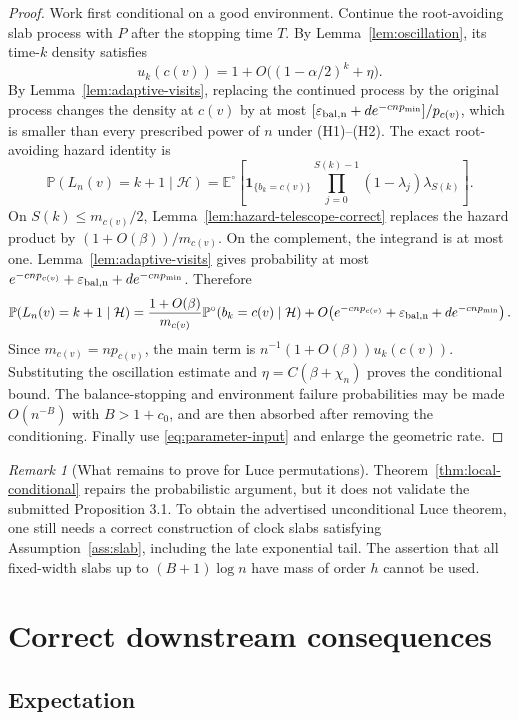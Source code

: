 \documentclass[11pt]{article}
\newcommand{\E}{\mathbb E}
\newcommand{\Pp}{\mathbb P}
\newcommand{\1}{\mathbf 1}
\newcommand{\cH}{\mathcal H}
\theoremstyle{remark}
\newtheorem{remark}[theorem]{Remark}
\begin{document}
\begin{proof}
Work first conditional on a good environment.  Continue the root-avoiding
slab process with $P$ after the stopping time $T$.  By
Lemma~\ref{lem:oscillation}, its time-$k$ density satisfies
\[
 u_k(c(v))=1+O\bigl((1-\alpha/2)^k+\eta\bigr).
\]
By Lemma~\ref{lem:adaptive-visits}, replacing the continued process by the
original process changes the density at $c(v)$ by at most
$[\varepsilon_{\rm bal,n}+d e^{-cnp_{\min}}]/p_{c(v)}$, which is smaller than
every prescribed power of $n$ under (H1)--(H2).  The exact root-avoiding hazard identity is
\[
 \Pp(L_n(v)=k+1\mid\cH)
 =\E^\circ\left[
  \1_{\{b_k=c(v)\}}
  \prod_{j=0}^{S(k)-1}(1-\lambda_j)\lambda_{S(k)}
 \right].
\]
On $S(k)\le m_{c(v)}/2$, Lemma~\ref{lem:hazard-telescope-correct} replaces
the hazard product by $(1+O(\beta))/m_{c(v)}$.  On the complement, the integrand is at most one.  Lemma~\ref{lem:adaptive-visits}
gives probability at most
$e^{-cnp_{c(v)}}+\varepsilon_{\rm bal,n}+d e^{-cnp_{\min}}$.  Therefore
\[
 \Pp(L_n(v)=k+1\mid\cH)
 =\frac{1+O(\beta)}{m_{c(v)}}
   \Pp^\circ(b_k=c(v)\mid\cH)
  +O\!\left(e^{-cnp_{c(v)}}+\varepsilon_{\rm bal,n}
                 +d e^{-cnp_{\min}}\right).
\]
Since $m_{c(v)}=np_{c(v)}$, the main term is
$n^{-1}(1+O(\beta))u_k(c(v))$.  Substituting the oscillation estimate and
$\eta=C(\beta+\chi_n)$ proves the conditional bound.  The balance-stopping and environment failure probabilities may be made
$O(n^{-B})$ with $B>1+c_0$, and are then absorbed after removing the
conditioning.  Finally use
\eqref{eq:parameter-input} and enlarge the geometric rate.
\end{proof}

\begin{remark}[What remains to prove for Luce permutations]
Theorem~\ref{thm:local-conditional} repairs the probabilistic argument, but it
does not validate the submitted Proposition 3.1.  To obtain the advertised
unconditional Luce theorem, one still needs a correct construction of clock
slabs satisfying Assumption~\ref{ass:slab}, including the late exponential
tail.  The assertion that all fixed-width slabs up to $(B+1)\log n$ have mass
of order $h$ cannot be used.
\end{remark}

\section{Correct downstream consequences}

\subsection{Expectation}
\end{document}
